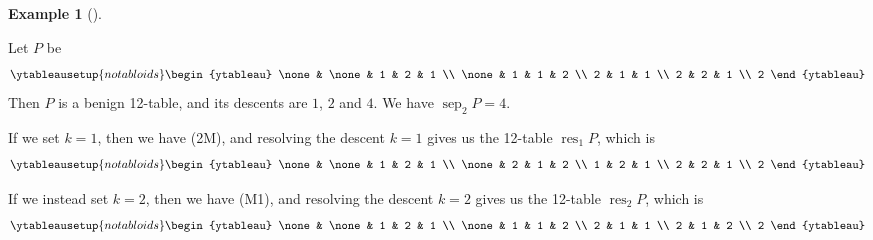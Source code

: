 \documentclass[numbers=enddot,12pt,final,onecolumn,notitlepage]{scrartcl}%
\theoremstyle{definition}
\newtheorem{exmp}[theo]{Example}
\newenvironment{example}[1][]
{\begin{exmp}[#1]\begin{leftbar}}
{\end{leftbar}\end{exmp}}
\begin{document}
\begin{example}
\label{exa.resolve.short}Let $P$ be
\[
\ytableausetup{notabloids}
\begin{ytableau}
\none& \none& 1 & 2 & 1 \\
\none& 1 & 1 & 2 \\
2 & 1 & 1 \\
2 & 2 & 1 \\
2
\end{ytableau}%
\]
Then $P$ is a benign 12-table, and its
descents are $1$, $2$ and $4$. We have $\operatorname*{sep}\nolimits_{2}P=4$.

If we set $k=1$, then we have (2M), and resolving the descent $k=1$
gives us the 12-table $\operatorname*{res}\nolimits_{1}P$, which is
\[
\ytableausetup{notabloids}
\begin{ytableau}
\none& \none& 1 & 2 & 1 \\
\none& 2 & 1 & 2 \\
1 & 2 & 1 \\
2 & 2 & 1 \\
2
\end{ytableau}%
\]

If we instead set $k=2$, then we have (M1), and resolving the descent
$k=2$ gives us the 12-table $\operatorname*{res}\nolimits_{2}P$, which is
\[
\ytableausetup{notabloids}
\begin{ytableau}
\none& \none& 1 & 2 & 1 \\
\none& 1 & 1 & 2 \\
2 & 1 & 1 \\
2 & 1 & 2 \\
2
\end{ytableau}%
\]


\end{example}
\end{document}
